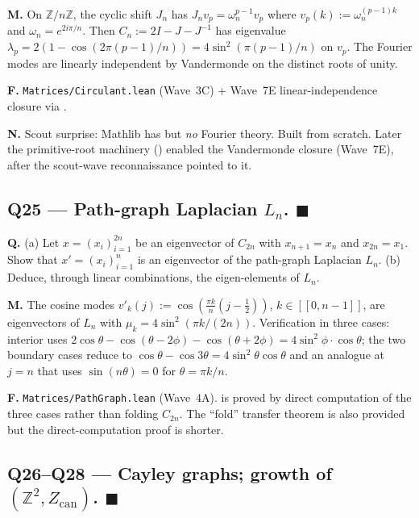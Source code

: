 \documentclass[11pt,a4paper]{article}
\newcommand{\done}[1]{\textcolor{donegreen}{\textbf{#1}}}
\newcommand{\lmod}[1]{\texttt{\small #1}}
\newcommand{\Z}{\mathbb{Z}}
\theoremstyle{plain}
\theoremstyle{definition}
\begin{document}
\textbf{M.} On $\Z/n\Z$, the cyclic shift $J_n$ has
$J_n v_p = \omega_n^{p-1} v_p$ where $v_p(k) := \omega_n^{(p-1)k}$
and $\omega_n = e^{2i\pi/n}$. Then $C_n := 2I - J - J^{-1}$ has
eigenvalue $\lambda_p = 2(1 - \cos(2\pi(p-1)/n)) = 4\sin^2(\pi(p-1)/n)$
on $v_p$. The Fourier modes are linearly independent by Vandermonde
on the distinct roots of unity.

\textbf{F.} \lmod{Matrices/Circulant.lean} (Wave~3C) + Wave~7E
linear-independence closure via
.

\textbf{N.} Scout surprise: Mathlib has 
but \emph{no} Fourier theory. Built from scratch. Later the
primitive-root machinery ()
enabled the Vandermonde closure (Wave~7E), after the scout-wave
reconnaissance pointed to it.

\subsection{Q25 --- Path-graph Laplacian $L_n$. \done{$\blacksquare$}}

\textbf{Q.} (a) Let $x = (x_i)_{i=1}^{2n}$ be an eigenvector of
$C_{2n}$ with $x_{n+1} = x_n$ and $x_{2n} = x_1$. Show that
$x' = (x_i)_{i=1}^n$ is an eigenvector of the path-graph Laplacian
$L_n$. (b) Deduce, through linear combinations, the eigen-elements
of $L_n$.

\textbf{M.} The cosine modes
$v'_k(j) := \cos(\tfrac{\pi k}{n}(j - \tfrac12))$, $k \in [\![0, n-1]\!]$,
are eigenvectors of $L_n$ with $\mu_k = 4\sin^2(\pi k/(2 n))$.
Verification in three cases: interior uses
$2\cos\theta - \cos(\theta - 2\phi) - \cos(\theta + 2\phi)
= 4 \sin^2\phi \cdot \cos\theta$; the two boundary cases reduce
to $\cos\theta - \cos 3\theta = 4\sin^2\theta \cos\theta$ and
an analogue at $j = n$ that uses $\sin(n\theta) = 0$ for
$\theta = \pi k/n$.

\textbf{F.} \lmod{Matrices/PathGraph.lean} (Wave~4A).
 is proved by direct
computation of the three cases rather than folding $C_{2n}$. The
``fold'' transfer theorem 
is also provided but the direct-computation proof is shorter.

\subsection{Q26--Q28 --- Cayley graphs; growth of $(\Z^2, Z_{\text{can}})$. \done{$\blacksquare$}}
\end{document}
